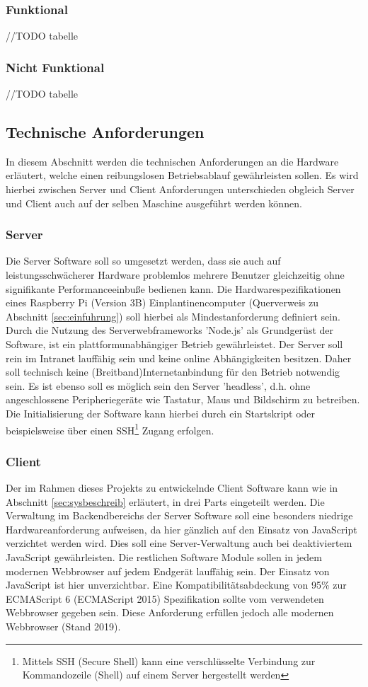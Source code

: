 \subsubsection{Funktional}\label{sec:anffunc}
//TODO tabelle
\subsubsection{Nicht Funktional}\label{sec:nichtfunc}
//TODO tabelle
\subsection{Technische Anforderungen}\label{sec:techanford}
In diesem Abschnitt werden die technischen Anforderungen an die Hardware erläutert, welche einen reibungslosen Betriebsablauf gewährleisten sollen. Es wird hierbei zwischen Server und Client Anforderungen unterschieden obgleich Server und Client auch auf der selben Maschine ausgeführt werden können. 
\subsubsection{Server}\label{sec:servertech}
Die Server Software soll so umgesetzt werden, dass sie auch auf leistungsschwächerer Hardware problemlos mehrere Benutzer gleichzeitig ohne signifikante Performanceeinbuße bedienen kann. Die Hardwarespezifikationen eines Raspberry Pi (Version 3B) Einplantinencomputer (Querverweis zu Abschnitt \ref{sec:einfuhrung}) soll hierbei als Mindestanforderung definiert sein. Durch die Nutzung des Serverwebframeworks 'Node.js' als Grundgerüst der Software, ist ein plattformunabhängiger Betrieb gewährleistet. Der Server soll rein im Intranet lauffähig sein und keine online Abhängigkeiten besitzen. Daher soll technisch keine (Breitband)Internetanbindung für den Betrieb notwendig sein. Es ist ebenso soll es möglich sein den Server 'headless', d.h. ohne angeschlossene Peripheriegeräte wie Tastatur, Maus und Bildschirm zu betreiben. Die Initialisierung der Software kann hierbei durch ein Startskript oder beispielsweise über einen SSH\footnote{Mittels SSH (Secure Shell) kann eine verschlüsselte Verbindung zur Kommandozeile (Shell) auf einem Server hergestellt werden} Zugang erfolgen.
\subsubsection{Client}\label{sec:clienttech}
Der im Rahmen dieses Projekts zu entwickelnde Client Software kann wie in Abschnitt \ref{sec:sysbeschreib} erläutert, in drei Parts eingeteilt werden. Die Verwaltung im Backendbereichs der Server Software soll eine besonders niedrige Hardwareanforderung aufweisen, da hier gänzlich auf den Einsatz von JavaScript verzichtet werden wird. Dies soll eine Server-Verwaltung auch bei deaktiviertem JavaScript gewährleisten. Die restlichen Software Module sollen in jedem modernen Webbrowser auf jedem Endgerät lauffähig sein. Der Einsatz von JavaScript ist hier unverzichtbar. Eine Kompatibilitätsabdeckung von 95\% zur ECMAScript 6 (ECMAScript 2015) Spezifikation sollte vom verwendeten Webbrowser gegeben sein. Diese Anforderung erfüllen jedoch alle modernen Webbrowser (Stand 2019)\cite{ECMAScri7:online}. 
